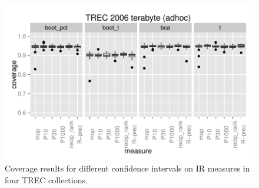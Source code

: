 \documentclass{sig-alt-release-2013}
\begin{document}
\begin{figure}
\includegraphics[width=\linewidth]{trec15-tb}
\caption{\label{results-1}Coverage results for different confidence intervals on IR measures in four TREC collections.}
\end{figure}
\end{document}
